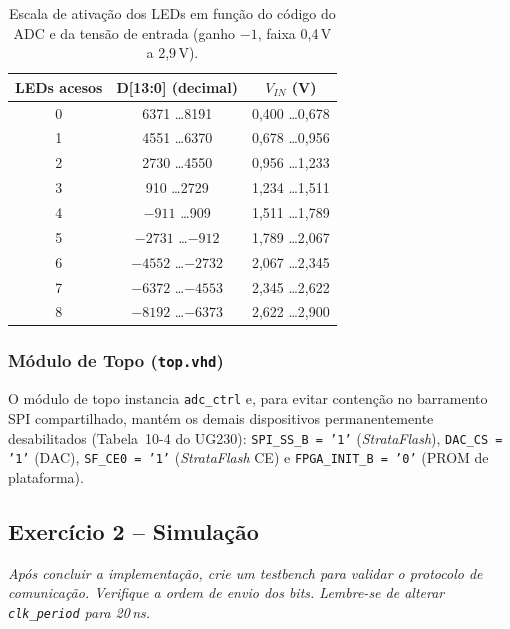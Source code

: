\documentclass[12pt,a4paper]{article}
\newcommand{\question}[1]{
    \vspace{0.8em}
    \noindent\textit{#1}
    \vspace{0.4em}
}
\begin{document}
\begin{table}[H]
\centering
\begin{tabular}{ccc}
\hline
\textbf{LEDs acesos} & \textbf{D[13:0] (decimal)} & \textbf{$V_{IN}$ (V)} \\
\hline
0 & \phantom{-}6371 \dots \phantom{-}8191 & 0{,}400 \dots 0{,}678 \\
1 & \phantom{-}4551 \dots \phantom{-}6370 & 0{,}678 \dots 0{,}956 \\
2 & \phantom{-}2730 \dots \phantom{-}4550 & 0{,}956 \dots 1{,}233 \\
3 & \phantom{-}\phantom{0}910 \dots \phantom{-}2729 & 1{,}234 \dots 1{,}511 \\
4 & $-911$ \dots \phantom{-}\phantom{0}909 & 1{,}511 \dots 1{,}789 \\
5 & $-2731$ \dots $-912$ & 1{,}789 \dots 2{,}067 \\
6 & $-4552$ \dots $-2732$ & 2{,}067 \dots 2{,}345 \\
7 & $-6372$ \dots $-4553$ & 2{,}345 \dots 2{,}622 \\
8 & $-8192$ \dots $-6373$ & 2{,}622 \dots 2{,}900 \\
\hline
\end{tabular}
\caption{Escala de ativação dos LEDs em função do código do ADC e da tensão de entrada
         (ganho $-1$, faixa 0{,}4\,V a 2{,}9\,V).}
\label{tab:led_scale}
\end{table}

\subsubsection{Módulo de Topo (\texttt{top.vhd})}

O módulo de topo instancia \texttt{adc\_ctrl} e, para evitar contenção no barramento SPI
compartilhado, mantém os demais dispositivos permanentemente desabilitados
(Tabela~10-4 do UG230): \texttt{SPI\_SS\_B = '1'} (\textit{StrataFlash}),
\texttt{DAC\_CS = '1'} (DAC), \texttt{SF\_CE0 = '1'} (\textit{StrataFlash} CE) e
\texttt{FPGA\_INIT\_B = '0'} (PROM de plataforma).

\subsection{Exercício 2 – Simulação}

\question{Após concluir a implementação, crie um testbench para validar o protocolo de
comunicação. Verifique a ordem de envio dos bits. Lembre-se de alterar \texttt{clk\_period}
para 20\,ns.}
\end{document}
